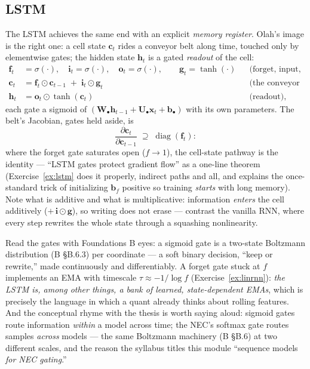 \documentclass[11pt]{article}
\numberwithin{equation}{section}
\theoremstyle{plain}
\theoremstyle{definition}
\theoremstyle{remark}
\DeclareMathOperator{\diag}{diag}
\newcommand{\x}{\bm{x}}
\newcommand{\bh}{\bm{h}}
\newcommand{\bc}{\bm{c}}
\newcommand{\bW}{\bm{W}}
\newcommand{\bU}{\bm{U}}
\newcommand{\sg}{\sigma}
\begin{document}
\subsection{LSTM}

The LSTM achieves the same end with an explicit \emph{memory register}. Olah's image is the right one: a cell state $\bc_t$ rides a conveyor belt along time, touched only by elementwise gates; the hidden state $\bh_t$ is a gated \emph{readout} of the cell:
\begin{equation}
\begin{aligned}
\bm f_t &= \sg(\cdot), \quad \bm i_t = \sg(\cdot), \quad \bm o_t = \sg(\cdot),
\qquad \bm g_t = \tanh(\cdot)
&&\text{(forget, input, output, candidate)}\\
\bc_t &= \bm f_t \odot \bc_{t-1} \;+\; \bm i_t \odot \bm g_t
&&\text{(the conveyor belt)}\\
\bh_t &= \bm o_t \odot \tanh(\bc_t)
&&\text{(readout),}
\end{aligned}
\label{eq:lstm}
\end{equation}
each gate a sigmoid of $(\bW_\bullet \bh_{t-1} + \bU_\bullet \x_t + \bm b_\bullet)$ with its own parameters. The belt's Jacobian, gates held aside, is
\begin{equation}
\frac{\partial \bc_t}{\partial \bc_{t-1}} \;\supseteq\; \diag(\bm f_t):
\label{eq:lstmhighway}
\end{equation}
where the forget gate saturates open ($f \to 1$), the cell-state pathway is the identity --- ``LSTM gates protect gradient flow'' as a one-line theorem (Exercise~\ref{ex:lstm} does it properly, indirect paths and all, and explains the once-standard trick of initializing $\bm b_f$ positive so training \emph{starts} with long memory). Note what is additive and what is multiplicative: information \emph{enters} the cell additively ($+\, \bm i \odot \bm g$), so writing does not erase --- contrast the vanilla RNN, where every step rewrites the whole state through a squashing nonlinearity.

Read the gates with Foundations B eyes: a sigmoid gate is a two-state Boltzmann distribution (B \S B.6.3) per coordinate --- a soft binary decision, ``keep or rewrite,'' made continuously and differentiably. A forget gate stuck at $f$ implements an EMA with timescale $\tau \approx -1/\log f$ (Exercise~\ref{ex:linrnn}): \emph{the LSTM is, among other things, a bank of learned, state-dependent EMAs}, which is precisely the language in which a quant already thinks about rolling features. And the conceptual rhyme with the thesis is worth saying aloud: sigmoid gates route information \emph{within} a model across time; the NEC's softmax gate routes samples \emph{across} models --- the same Boltzmann machinery (B \S B.6) at two different scales, and the reason the syllabus titles this module ``sequence models \emph{for NEC gating}.''
\end{document}
